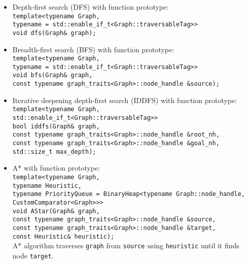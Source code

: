 \documentclass{article}
\begin{document}
\begin{itemize}
	\item Depth-first search (DFS) with function prototype:\\
		\texttt{template<typename Graph,\\\hspace*{4em}
				typename = std::enable\_if\_t<Graph::traversableTag>>\\
		void dfs(Graph\& graph);}
	\item Breadth-first search (BFS) with function prototype:\\
		\texttt{template<typename Graph,\\\hspace*{4em}
				typename = std::enable\_if\_t<Graph::traversableTag>>\\
		void bfs(Graph\& graph,\\\hspace*{4em}
		const typename graph\_traits<Graph>::node\_handle
				 \&source);}
	\item Iterative deepening depth-first search (IDDFS) with function prototype:\\
		\texttt{template<typename Graph,\\\hspace*{4em}
				std::enable\_if\_t<Graph::traversableTag>>\\
		bool iddfs(Graph\& graph,\\\hspace*{5em}
		const typename graph\_traits<Graph>::node\_handle \&root\_nh,\\\hspace*{5em}
		const typename graph\_traits<Graph>::node\_handle \&goal\_nh,\\\hspace*{5em}
		std::size\_t max\_depth);}
	\item A* with function prototype:\\
		\texttt{template<typename Graph,\\\hspace*{4.5em}typename
			Heuristic,\\\hspace*{4em}
			typename PriorityQueue = BinaryHeap<typename Graph::node\_handle,\\\hspace*{22em}
			CustomComparator<Graph>>>\\
			void AStar(Graph\& graph,\\\hspace*{5.27em}
			const typename graph\_traits<Graph>::node\_handle \&source,\\\hspace*{5.27em}
			const typename graph\_traits<Graph>::node\_handle \&target,\\\hspace*{5.27em}
			const Heuristic\& heuristic);}\\
		A* algorithm traverses \texttt{graph} from \texttt{source} using \texttt{heuristic} until it finds node \texttt{target}.
\end{itemize}
\end{document}

